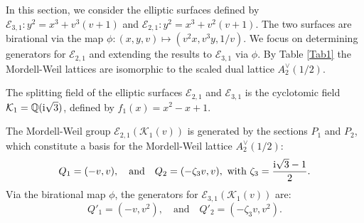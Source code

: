 \documentclass[11pt]{amsart}
\begin{document}
In this section, we consider the elliptic surfaces defined by $\mathcal{E}_{3,1}: y^2 = x^3 + v^3(v+1)$ and $\mathcal{E}_{2,1}: y^2 = x^3 + v^2(v+1)$. 
The two surfaces are birational via the map $\phi: (x, y, v) \mapsto (v^2 x, v^3 y, 1/v)$. We focus on determining generators for $\mathcal{E}_{2,1}$ and extending the results to $\mathcal{E}_{3,1}$ via $\phi$. By Table \ref{Tab1} the Mordell-Weil lattices are isomorphic to the scaled dual lattice $A_2^\vee(1/2)$.

\begin{thm} \label{main7}
	The splitting field of the elliptic surfaces $\mathcal{E}_{2,1}$ and $\mathcal{E}_{3,1}$ is the cyclotomic field $\mathcal{K}_{1} = \mathbb{Q}({\rm{i}} \sqrt{3})$, defined by $f_1(x)=x^2-x+1$.
	 
	The Mordell-Weil group $\mathcal{E}_{2,1}(\mathcal{K}_{1}(v))$ is generated by the sections $P_1$ and $P_2$, which constitute a basis for the Mordell-Weil lattice $A_2^\vee(1/2)$:
	\begin{equation}
		\label{Eq1}
		Q_1=(-v, v), \quad \text{and} \quad
		Q_2 = (-\zeta_3 v, v), \ \text{with } \zeta_3=\frac{{\rm{i}} \sqrt{3}-1}{2}.
	\end{equation}
	Via the birational map $\phi$, the generators for $\mathcal{E}_{3,1}(\mathcal{K}_{1}(v))$ are:
	\begin{equation} 	\label{Eq1-2}
		Q'_1=(-v, v^2), \quad \text{and} \quad
		Q'_2 = (-\zeta_3 v, v^2).
	\end{equation}	
\end{thm}
\end{document}

